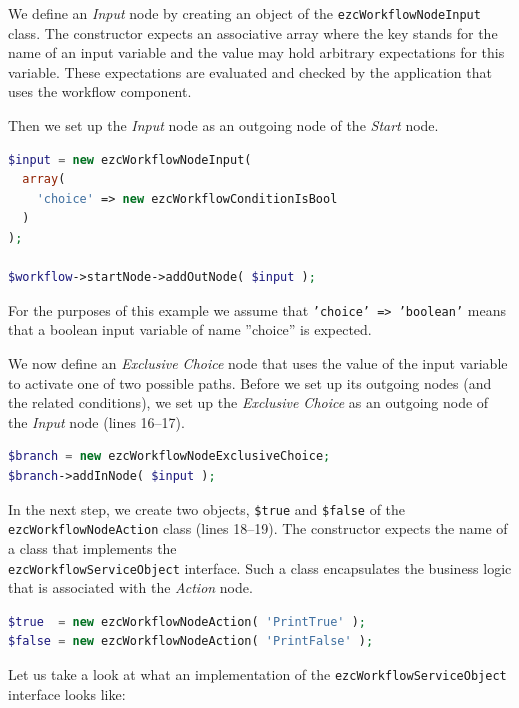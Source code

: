 We define an \emph{Input} node by creating an object of the
\texttt{ezcWorkflowNodeInput} class. The constructor expects an associative
array where the key stands for the name of an input variable and the value
may hold arbitrary expectations for this variable. These expectations are
evaluated and checked by the application that uses the workflow component.

Then we set up the \emph{Input} node as an outgoing node of the \emph{Start}
node.

\begin{lstlisting}[language=PHP,firstnumber=9]
$input = new ezcWorkflowNodeInput(
  array(
    'choice' => new ezcWorkflowConditionIsBool
  )
);

$workflow->startNode->addOutNode( $input );
\end{lstlisting}

For the purposes of this example we assume that \texttt{'choice' => 'boolean'}
means that a boolean input variable of name ''choice'' is expected.

We now define an \emph{Exclusive Choice} node that uses the value of the input
variable to activate one of two possible paths. Before we set up its outgoing
nodes (and the related conditions), we set up the \emph{Exclusive Choice} as
an outgoing node of the \emph{Input} node (lines 16--17).

\begin{lstlisting}[language=PHP,firstnumber=16]
$branch = new ezcWorkflowNodeExclusiveChoice;
$branch->addInNode( $input );
\end{lstlisting}

In the next step, we create two objects, \texttt{\$true} and \texttt{\$false}
of the \texttt{ezcWorkflowNodeAction} class (lines 18--19). The constructor
expects the name of a class that implements the\\ \texttt{ezcWorkflowServiceObject}
interface. Such a class encapsulates the business logic that is associated with the
\emph{Action} node.

\begin{lstlisting}[language=PHP,firstnumber=18]
$true  = new ezcWorkflowNodeAction( 'PrintTrue' );
$false = new ezcWorkflowNodeAction( 'PrintFalse' );
\end{lstlisting}

Let us take a look at what an implementation of the
\texttt{ezcWorkflowServiceObject} interface looks like:

